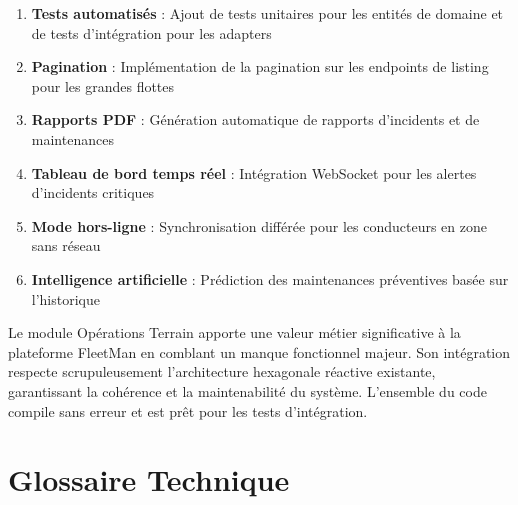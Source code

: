 \documentclass[12pt,a4paper]{report}
\begin{document}
\begin{enumerate}[leftmargin=2cm]
  \item \textbf{Tests automatisés} : Ajout de tests unitaires pour les entités de domaine et de tests d'intégration pour les adapters
  \item \textbf{Pagination} : Implémentation de la pagination sur les endpoints de listing pour les grandes flottes
  \item \textbf{Rapports PDF} : Génération automatique de rapports d'incidents et de maintenances
  \item \textbf{Tableau de bord temps réel} : Intégration WebSocket pour les alertes d'incidents critiques
  \item \textbf{Mode hors-ligne} : Synchronisation différée pour les conducteurs en zone sans réseau
  \item \textbf{Intelligence artificielle} : Prédiction des maintenances préventives basée sur l'historique
\end{enumerate}

\vspace{1cm}
\begin{successbox}[title={Conclusion}]
Le module Opérations Terrain apporte une valeur métier significative à la plateforme FleetMan en comblant un manque fonctionnel majeur. Son intégration respecte scrupuleusement l'architecture hexagonale réactive existante, garantissant la cohérence et la maintenabilité du système. L'ensemble du code compile sans erreur et est prêt pour les tests d'intégration.
\end{successbox}

\appendix

\chapter{Glossaire Technique}
\end{document}
